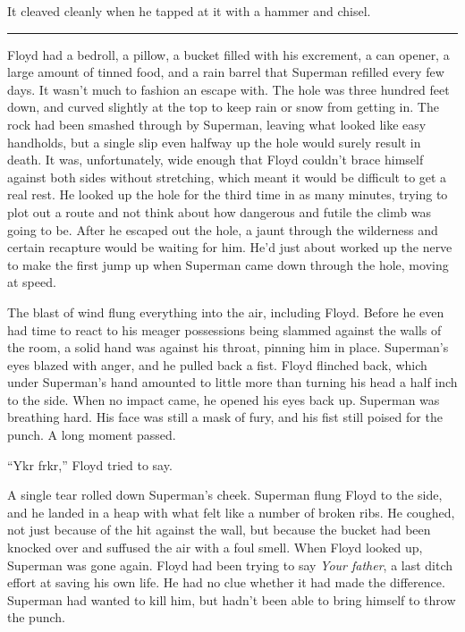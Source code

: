 \documentclass[ebook,12pt]{memoir}
\begin{document}
It cleaved cleanly when he tapped at it with a hammer and chisel.

\begin{center}\rule{0.5\linewidth}{\linethickness}\end{center}

Floyd had a bedroll, a pillow, a bucket filled with his excrement, a can
opener, a large amount of tinned food, and a rain barrel that Superman
refilled every few days. It wasn't much to fashion an escape with. The
hole was three hundred feet down, and curved slightly at the top to keep
rain or snow from getting in. The rock had been smashed through by
Superman, leaving what looked like easy handholds, but a single slip
even halfway up the hole would surely result in death. It was,
unfortunately, wide enough that Floyd couldn't brace himself against
both sides without stretching, which meant it would be difficult to get
a real rest. He looked up the hole for the third time in as many
minutes, trying to plot out a route and not think about how dangerous
and futile the climb was going to be. After he escaped out the hole, a
jaunt through the wilderness and certain recapture would be waiting for
him. He'd just about worked up the nerve to make the first jump up when
Superman came down through the hole, moving at speed.

The blast of wind flung everything into the air, including Floyd. Before
he even had time to react to his meager possessions being slammed
against the walls of the room, a solid hand was against his throat,
pinning him in place. Superman's eyes blazed with anger, and he pulled
back a fist. Floyd flinched back, which under Superman's hand amounted
to little more than turning his head a half inch to the side. When no
impact came, he opened his eyes back up. Superman was breathing hard.
His face was still a mask of fury, and his fist still poised for the
punch. A long moment passed.

``Ykr frkr,'' Floyd tried to say.

A single tear rolled down Superman's cheek. Superman flung Floyd to the
side, and he landed in a heap with what felt like a number of broken
ribs. He coughed, not just because of the hit against the wall, but
because the bucket had been knocked over and suffused the air with a
foul smell. When Floyd looked up, Superman was gone again. Floyd had
been trying to say \emph{Your father}, a last ditch effort at saving his
own life. He had no clue whether it had made the difference. Superman
had wanted to kill him, but hadn't been able to bring himself to throw
the punch.
\end{document}
